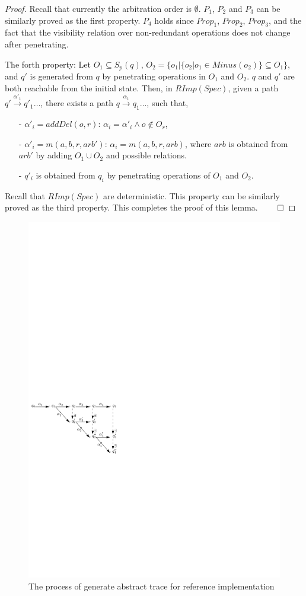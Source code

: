\begin {proof}
Recall that currently the arbitration order is $\emptyset$. $P_1$, $P_2$ and $P_3$ can be similarly proved as the first property. $P_4$ holds since $Prop_1$, $Prop_2$, $Prop_3$, and the fact that the visibility relation over non-redundant operations does not change after penetrating.

The forth property: Let $O_1 \subseteq S_p(q)$, $O_2 = \{ o_1 \vert  \{ o_2 \vert o_1 \in Minus(o_2) \} \subseteq O_1 \}$, and $q'$ is generated from $q$ by penetrating operations in $O_1$ and $O_2$. $q$ and $q'$ are both reachable from the initial state. Then, in $RImp(Spec)$, given a path $q' {\xrightarrow{\alpha'_1}} q'_1 \ldots$, there exists a path $q {\xrightarrow{\alpha_1}} q_1 \ldots$, such that,

\begin{itemize}
\setlength{\itemsep}{0.5pt}
\item[-] $\alpha'_i = addDel(o,r)$: $\alpha_i = \alpha'_i \wedge o \notin O_r$,


\item[-] $\alpha'_i = m(a,b,r,arb')$: $\alpha_i = m(a,b,r,arb)$, where $arb$ is obtained from $arb'$ by adding $O_1 \cup O_2$ and possible relations.

\item[-] $q'_i$ is obtained from $q_i$ by penetrating operations of $O_1$ and $O_2$.
\end{itemize} 

Recall that $RImp(Spec)$ are deterministic. This property can be similarly proved as the third property. This completes the proof of this lemma. $\qed$
\end {proof}

\begin{figure}[t]
  \centering
  \includegraphics[width=0.4 \textwidth]{figures/PIC-Generate-AbstractTrace-NormaltoCompact.pdf}
  \caption{The process of generate abstract trace for reference implementation}
  \label{fig:the process of generate abstract trace for reference implementation}
\end{figure}


